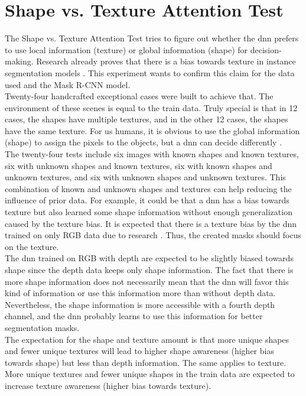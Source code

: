 	\section{Shape vs. Texture Attention Test}
	\label{sec:shape-texutre-attention-test}
		The Shape vs. Texture Attention Test tries to figure out whether the \ac{dnn} prefers to use local information (texture) or global information (shape) for decision-making. Research already proves that there is a bias towards texture in instance segmentation models \cite{Theodoridis2022}. This experiment wants to confirm this claim for the data used and the Mask R-CNN model.\\
		Twenty-four handcrafted exceptional cases were built to achieve that. The environment of these scenes is equal to the train data. Truly special is that in 12 cases, the shapes have multiple textures, and in the other 12 cases, the shapes have the same texture. For us humans, it is obvious to use the global information (shape) to assign the pixels to the objects, but a \ac{dnn} can decide differently \cite{Geirhos2020}\cite{Mohla2022}\cite{Baker2020}.\\
		The twenty-four tests include six images with known shapes and known textures, six with unknown shapes and known textures, six with known shapes and unknown textures, and six with unknown shapes and unknown textures. This combination of known and unknown shapes and textures can help reducing the influence of prior data. For example, it could be that a \ac{dnn} has a bias towards texture but also learned some shape information without enough generalization caused by the texture bias.
		\clearpage
		It is expected that there is a texture bias by the \ac{dnn} trained on only RGB data due to research \cite{Theodoridis2022}. Thus, the created masks should focus on the texture. \\
		The \ac{dnn} trained on RGB with depth are expected to be slightly biased towards shape since the depth data keeps only shape information. The fact that there is more shape information does not necessarily mean that the \ac{dnn} will favor this kind of information or use this information more than without depth data. Nevertheless, the shape information is more accessible with a fourth depth channel, and the \ac{dnn} probably learns to use this information for better segmentation masks.\\
		The expectation for the shape and texture amount is that more unique shapes and fewer unique textures will lead to higher shape awareness (higher bias towards shape) but less than depth information. The same applies to texture. More unique textures and fewer unique shapes in the train data are expected to increase texture awareness (higher bias towards texture). \\
